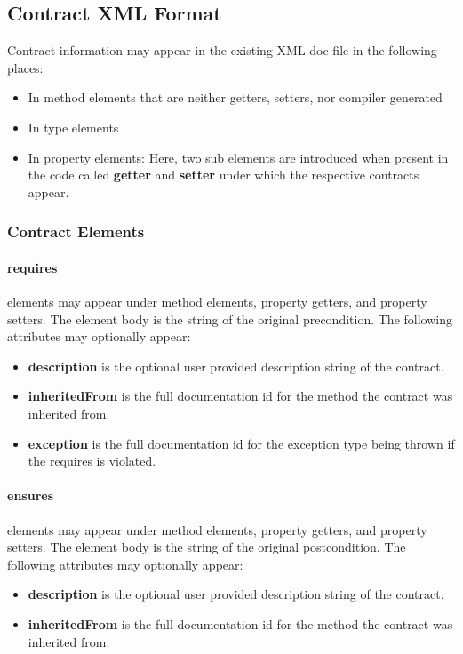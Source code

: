 \documentclass{article}
\begin{document}
\subsection{Contract XML Format}

Contract information may appear in the existing XML doc file in the
following places:
\begin{itemize}
\item In method elements that are neither getters, setters, nor compiler
  generated
\item In type elements
\item In property elements: Here, two sub elements are introduced when
  present in the code called \textbf{getter} and \textbf{setter} under which the
  respective contracts appear.
\end{itemize}

\subsubsection{Contract Elements}

\paragraph{requires} elements may appear under method elements, property
getters, and property setters. The element body is the string of the
original precondition. The following attributes may optionally appear:
\begin{itemize}
\item \textbf{description} is the optional user provided description
  string of the contract.
\item \textbf{inheritedFrom} is the full documentation id for the
  method the contract was inherited from.
\item \textbf{exception} is the full documentation id for the
  exception type being thrown if the requires is violated.
\end{itemize}

\paragraph{ensures} elements may appear under method elements, property
getters, and property setters. The element body is the string of the
original postcondition. The following attributes may optionally appear:
\begin{itemize}
\item \textbf{description} is the optional user provided description
  string of the contract.
\item \textbf{inheritedFrom} is the full documentation id for the
  method the contract was inherited from.
\end{itemize}
\end{document}
